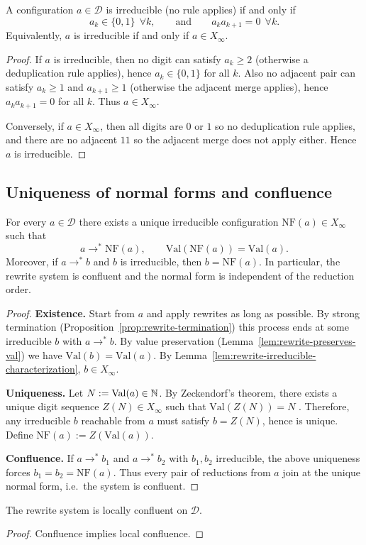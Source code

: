 \begin{lemma}\label{lem:rewrite-irreducible-characterization}
A configuration $a\in\mathcal{D}$ is irreducible (no rule applies) if and only if
\[
a_k\in\{0,1\}\ \ \forall k,\qquad\text{and}\qquad a_ka_{k+1}=0\ \ \forall k.
\]
Equivalently, $a$ is irreducible if and only if $a\in X_\infty$.
\end{lemma}
\begin{proof}
If $a$ is irreducible, then no digit can satisfy $a_k\ge 2$ (otherwise a deduplication rule applies), hence $a_k\in\{0,1\}$ for all $k$.
Also no adjacent pair can satisfy $a_k\ge 1$ and $a_{k+1}\ge 1$ (otherwise the adjacent merge applies), hence $a_ka_{k+1}=0$ for all $k$.
Thus $a\in X_\infty$.

Conversely, if $a\in X_\infty$, then all digits are $0$ or $1$ so no deduplication rule applies, and there are no adjacent $11$ so the adjacent merge does not apply either.
Hence $a$ is irreducible.
\end{proof}

\subsection{Uniqueness of normal forms and confluence}\label{app:rewrite-confluence}
\begin{theorem}\label{thm:rewrite-unique-normal-form}
For every $a\in\mathcal{D}$ there exists a unique irreducible configuration $\mathrm{NF}(a)\in X_\infty$ such that
\[
a\to^\ast \mathrm{NF}(a),\qquad \mathrm{Val}(\mathrm{NF}(a))=\mathrm{Val}(a).
\]
Moreover, if $a\to^\ast b$ and $b$ is irreducible, then $b=\mathrm{NF}(a)$.
In particular, the rewrite system is confluent and the normal form is independent of the reduction order.
\end{theorem}
\begin{proof}
\textbf{Existence.}
Start from $a$ and apply rewrites as long as possible.
By strong termination (Proposition~\ref{prop:rewrite-termination}) this process ends at some irreducible $b$ with $a\to^\ast b$.
By value preservation (Lemma~\ref{lem:rewrite-preserves-val}) we have $\mathrm{Val}(b)=\mathrm{Val}(a)$.
By Lemma~\ref{lem:rewrite-irreducible-characterization}, $b\in X_\infty$.

\textbf{Uniqueness.}
Let $N:=\mathrm{Val}(a)\in\mathbb{N}$.
By Zeckendorf's theorem, there exists a unique digit sequence $Z(N)\in X_\infty$ such that $\mathrm{Val}(Z(N))=N$ \cite{Zeckendorf1972}.
Therefore, any irreducible $b$ reachable from $a$ must satisfy $b=Z(N)$, hence is unique.
Define $\mathrm{NF}(a):=Z(\mathrm{Val}(a))$.

\textbf{Confluence.}
If $a\to^\ast b_1$ and $a\to^\ast b_2$ with $b_1,b_2$ irreducible, the above uniqueness forces $b_1=b_2=\mathrm{NF}(a)$.
Thus every pair of reductions from $a$ join at the unique normal form, i.e.\ the system is confluent.
\end{proof}

\begin{corollary}\label{cor:rewrite-local-confluence}
The rewrite system is locally confluent on $\mathcal{D}$.
\end{corollary}
\begin{proof}
Confluence implies local confluence.
\end{proof}

